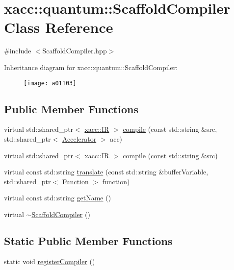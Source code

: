 \hypertarget{a01103}{}\section{xacc\+:\+:quantum\+:\+:Scaffold\+Compiler Class Reference}
\label{a01103}


{\ttfamily \#include $<$Scaffold\+Compiler.\+hpp$>$}

Inheritance diagram for xacc\+:\+:quantum\+:\+:Scaffold\+Compiler\+:\begin{figure}[H]
\begin{center}
\leavevmode
\texttt{[image: a01103]}
\end{center}
\end{figure}
\subsection*{Public Member Functions}
\begin{DoxyCompactItemize}
\item 
virtual std\+::shared\+\_\+ptr$<$ \hyperlink{a01499}{xacc\+::\+IR} $>$ \hyperlink{a01103_a7caede75bb2304ba405966651b115543}{compile} (const std\+::string \&src, std\+::shared\+\_\+ptr$<$ \hyperlink{a01435}{Accelerator} $>$ acc)
\item 
virtual std\+::shared\+\_\+ptr$<$ \hyperlink{a01499}{xacc\+::\+IR} $>$ \hyperlink{a01103_a3736ecc229fe6acdd4c991e85d7a1f08}{compile} (const std\+::string \&src)
\item 
virtual const std\+::string \hyperlink{a01103_ac7ca2941e987ba579c6f50cfbd7fb0dc}{translate} (const std\+::string \&buffer\+Variable, std\+::shared\+\_\+ptr$<$ \hyperlink{a01475}{Function} $>$ function)
\item 
virtual const std\+::string \hyperlink{a01103_a3f537054a3924a1d14f4ceb0f0181161}{get\+Name} ()
\item 
virtual \hyperlink{a01103_afb26398b07377ab9ddebc43a9376a6dd}{$\sim$\+Scaffold\+Compiler} ()
\end{DoxyCompactItemize}
\subsection*{Static Public Member Functions}
\begin{DoxyCompactItemize}
\item 
static void \hyperlink{a01103_aed16dda1e919e5af6de9953a656f62ce}{register\+Compiler} ()
\end{DoxyCompactItemize}
